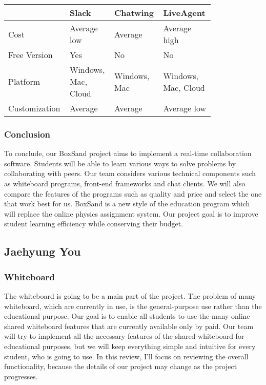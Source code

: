 \documentclass[10pt]{article}
\begin{document}
            \begin{tabular}{ | p{0.2\linewidth} | p{0.2\linewidth} | p{0.2\linewidth} | p{0.2\linewidth} | } \hline
                 & Slack & Chatwing & LiveAgent \\ \hline
                Cost & Average low & Average & Average high \\ \hline
                Free Version & Yes & No & No \\ \hline
                Platform & Windows, Mac, Cloud & Windows, Mac & Windows, Mac, Cloud \\ \hline
                Customization & Average & Average & Average low \\ \hline
            \end{tabular}

        \subsubsection{Conclusion}
            To conclude, our BoxSand project aims to implement a real-time collaboration software. Students will be able to learn various ways to solve problems by collaborating with peers. Our team considers various technical components such as whiteboard programs, front-end frameworks and chat clients. We will also compare the features of the programs such as quality and price and select the one that work best for us. BoxSand is a new style of the education program which will replace the online physics assignment system. Our project goal is to improve student learning efficiency while conserving their budget.

    \subsection{Jaehyung You}
        \subsubsection{Whiteboard}
            The whiteboard is going to be a main part of the project. The problem of many whiteboard, which are currently in use, is the general-purpose use rather than the educational purpose. Our goal is to enable all students to use the many online shared whiteboard features that are currently available only by paid. Our team will try to implement all the necessary features of the shared whiteboard for educational purposes, but we will keep everything simple and intuitive for every student, who is going to use. In this review, I’ll focus on reviewing the overall functionality, because the details of our project may change as the project progresses.
\end{document}
